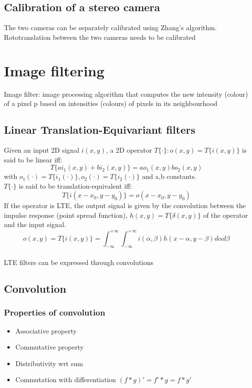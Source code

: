 \documentclass{article}
\begin{document}
\subsection{Calibration of a stereo camera}
The two cameras can be separately calibrated using Zhang's algorithm.\\
Rototranslation between the two cameras needs to be calibrated

\section{Image filtering}
Image filter: image processing algorithm that computes the new intensity (colour) of a pixel p based on intensities (colours) of pixels in its neighbourhood
\subsection{Linear Translation-Equivariant filters}
Given an input 2D signal $i(x,y)$, a 2D operator $T\{\cdot\}:o(x,y)=T\{i(x,y)\}$ is said to be linear iff:
$$T\{ai_1(x,y)+bi_2(x,y)\}=ao_1(x,y)bo_2(x,y)$$ with $o_1(\cdot)=T\{i_1(\cdot)\}, o_2(\cdot)=T\{i_2(\cdot)\}$ and a,b constants.\\
$T\{\cdot\}$ is said to be translation-equivalent iff:
$$T\{i(x-x_0,y-y_0)\}=o(x-x_0,y-y_0)$$
If the operator is LTE, the output signal is given by the convolution between the impulse response (point spread function), $h(x,y)=T\{\delta(x,y)\}$ of the operator and the input signal.
$$o(x,y)=T\{i(x,y)\}=\int_{-\infty}^{+\infty} \int_{-\infty}^{+\infty} i(\alpha,\beta)h(x-\alpha,y-\beta)d\alpha d\beta$$\\
LTE filters can be expressed through convolutions

\subsection{Convolution}
\subsubsection{Properties of convolution}
\begin{itemize}
    \item Associative property
    \item Commutative property
    \item Distributivity wrt sum
    \item Commutation with differentiation $(f*g)'=f'*g=f*g'$
\end{itemize}
\end{document}
